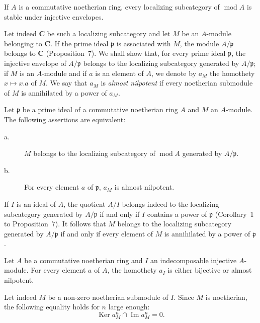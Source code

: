 \begin{proposition}
If $A$ is a commutative noetherian ring, every localizing subcategory of
$\operatorname{mod} A$ is stable under injective envelopes.
\end{proposition}

Let indeed $\mathbf{C}$ be such a localizing subcategory and let $M$ be
an $A$-module belonging to $\mathbf{C}$. If the prime ideal
$\mathfrak{p}$ is associated with $M$, the module $A/\mathfrak{p}$
belongs to $\mathbf{C}$ (Proposition~7). We shall show that, for every
prime ideal $\mathfrak{p}$, the injective envelope of $A/\mathfrak{p}$
belongs to the localizing subcategory generated by $A/\mathfrak{p}$; if
$M$ is an $A$-module and if $a$ is an element of $A$, we denote by $a_M$
the homothety $x \mapsto x.a$ of $M$. We say that $a_M$ is
\emph{almost nilpotent} if every noetherian submodule of $M$ is
annihilated by a power of $a_M$.

\begin{lemma}
Let $\mathfrak{p}$ be a prime ideal of a commutative noetherian ring $A$
and $M$ an $A$-module. The following assertions are equivalent:
\begin{description}
\item[\normalfont a.] $M$ belongs to the localizing subcategory of
  $\operatorname{mod} A$ generated by $A/\mathfrak{p}$.
\item[\normalfont b.] For every element $a$ of $\mathfrak{p}$, $a_M$ is
  almost nilpotent.
\end{description}
\end{lemma}

If $I$ is an ideal of $A$, the quotient $A/I$ belongs indeed to the
localizing subcategory generated by $A/\mathfrak{p}$ if and only if $I$
contains a power of $\mathfrak{p}$ (Corollary~1 to Proposition~7). It
follows that $M$ belongs to the localizing subcategory generated by
$A/\mathfrak{p}$ if and only if every element of $M$ is annihilated by a
power of $\mathfrak{p}$.

\begin{lemma}
Let $A$ be a commutative noetherian ring and $I$ an indecomposable
injective $A$-module. For every element $a$ of $A$, the homothety $a_I$
is either bijective or almost nilpotent.
\end{lemma}

Let indeed $M$ be a non-zero noetherian submodule of $I$. Since $M$ is
noetherian, the following equality holds for $n$ large enough:
\[
\operatorname{Ker} a_M^n \cap \operatorname{Im} a_M^n = 0.
\]

